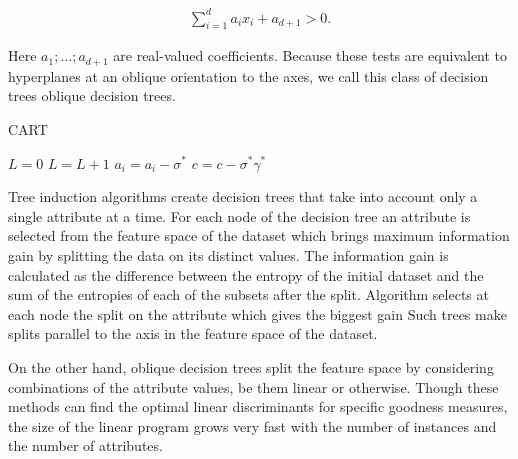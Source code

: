 \documentclass[12pt,preprint]{elsarticle}
\begin{document}
\begin{align}
\sum_{i=1}^d a_i x_i + a_{d+1} > 0.
\end{align}

Here $a_1; \dots ; a_{d+1}$ are real-valued coefficients. Because these tests are equivalent to hyperplanes at an oblique orientation to the axes, we call this class of decision trees oblique
decision trees.

\begin{algorithm}[ht]
\caption{CART}\label{alg:cap}
\begin{algorithmic}
    \State $L = 0$
        \STATE $L=L+1$
            \ENDFOR
            \STATE $a_i=a_i-\sigma^*$
            \STATE $c=c-\sigma^* \gamma^*$
        \ENDFOR
    \ENDWHILE
\end{algorithmic}
\end{algorithm}

Tree induction algorithms create decision trees that take into  account only a single attribute at  a time. For each node of the decision tree an attribute is selected from the  feature  space  of  the  dataset  which  brings  maximum information gain  by splitting the  data on its  distinct values. The information gain is  calculated as the difference between the entropy of the initial dataset and the sum of the entropies of each of the subsets after the split. Algorithm selects at each node the split on the attribute which gives the biggest gain Such trees  make splits parallel to the axis in the feature  space of the  dataset. 

On the other  hand, oblique decision  trees  split  the  feature  space  by  considering combinations  of  the  attribute  values,  be  them  linear  or otherwise. Though these methods can find the optimal linear discriminants for specific goodness measures, the size of the linear program grows very fast with the number of instances and the number of attributes.
\end{document}
